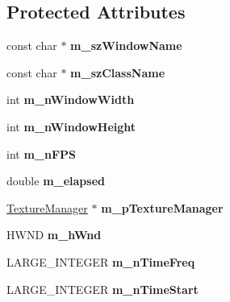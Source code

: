 \subsection*{Protected Attributes}
\begin{DoxyCompactItemize}
\item 
\mbox{\label{class_app_af51be807ea821e74f7a3549c5fc2efd1}} 
const char $\ast$ {\bfseries m\+\_\+sz\+Window\+Name}
\item 
\mbox{\label{class_app_a5dc5fe7bf2a09a905a9afebbe431ed63}} 
const char $\ast$ {\bfseries m\+\_\+sz\+Class\+Name}
\item 
\mbox{\label{class_app_a3356a47ae89df7132a0fe1d7e0e0303f}} 
int {\bfseries m\+\_\+n\+Window\+Width}
\item 
\mbox{\label{class_app_ab11a6b51467e798cd94725b1aab1bd67}} 
int {\bfseries m\+\_\+n\+Window\+Height}
\item 
\mbox{\label{class_app_a4cb1dc927a928c83575cae896ad5130c}} 
int {\bfseries m\+\_\+n\+F\+PS}
\item 
\mbox{\label{class_app_a5c157592032f786ca57d7df57e13c9cb}} 
double {\bfseries m\+\_\+elapsed}
\item 
\mbox{\label{class_app_ae327817737d67abd7516d788ccb97b95}} 
\mbox{\hyperlink{class_texture_manager}{Texture\+Manager}} $\ast$ {\bfseries m\+\_\+p\+Texture\+Manager}
\item 
\mbox{\label{class_app_a43e9dcb9a6a49cea143715062ddf3727}} 
H\+W\+ND {\bfseries m\+\_\+h\+Wnd}
\item 
\mbox{\label{class_app_a09f11582a39a8678164538b1dd337ca7}} 
L\+A\+R\+G\+E\+\_\+\+I\+N\+T\+E\+G\+ER {\bfseries m\+\_\+n\+Time\+Freq}
\item 
\mbox{\label{class_app_aeb3090844e72a34ba3a02be963d03c39}} 
L\+A\+R\+G\+E\+\_\+\+I\+N\+T\+E\+G\+ER {\bfseries m\+\_\+n\+Time\+Start}
\item 
\mbox{\label{class_app_a3248bd868a87f622ec216d003e074b33}} 

\end{DoxyCompactItemize}
